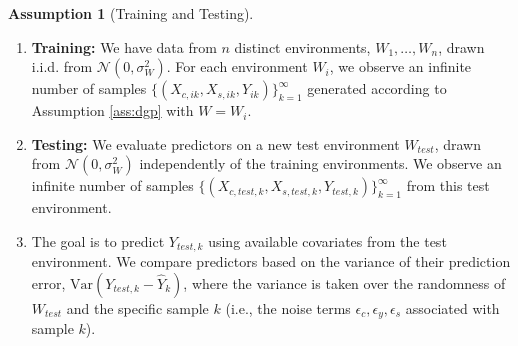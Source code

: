 \documentclass{article}
\theoremstyle{definition}
\newtheorem{assumption}[theorem]{Assumption}
\theoremstyle{remark}
\newcommand{\Var}{\mathrm{Var}}
\newcommand{\N}{\mathcal{N}} %
\begin{document}
\begin{assumption}[Training and Testing] \label{ass:traintest}
\begin{enumerate}
    \item \textbf{Training:} We have data from $n$ distinct environments, $W_1, \dots, W_n$, drawn i.i.d. from $\N(0, \sigma_W^2)$. For each environment $W_i$, we observe an infinite number of samples $\{(X_{c,ik}, X_{s,ik}, Y_{ik})\}_{k=1}^\infty$ generated according to Assumption \ref{ass:dgp} with $W=W_i$.
    \item \textbf{Testing:} We evaluate predictors on a new test environment $W_{test}$, drawn from $\N(0, \sigma_W^2)$ independently of the training environments. We observe an infinite number of samples $\{(X_{c,test,k}, X_{s,test,k}, Y_{test,k})\}_{k=1}^\infty$ from this test environment.
    \item The goal is to predict $Y_{test,k}$ using available covariates from the test environment. We compare predictors based on the variance of their prediction error, $\Var(Y_{test,k} - \hat{Y}_k)$, where the variance is taken over the randomness of $W_{test}$ and the specific sample $k$ (i.e., the noise terms $\epsilon_c, \epsilon_y, \epsilon_s$ associated with sample $k$).
\end{enumerate}
\end{assumption}
\end{document}
